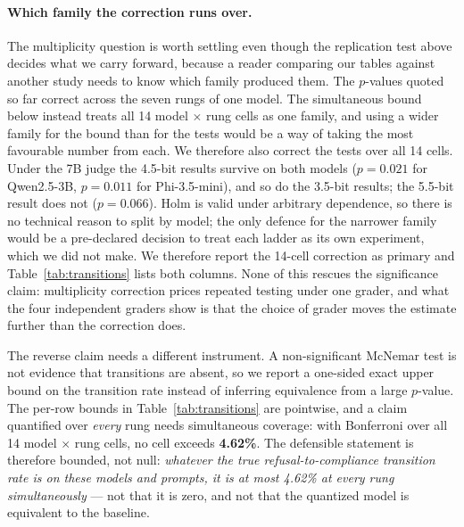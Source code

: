 \documentclass[11pt,a4paper]{article}
\begin{document}
\paragraph{Which family the correction runs over.} The multiplicity question is
worth settling even though the replication test above decides what we carry
forward, because a reader comparing our tables against another study needs to
know which family produced them. The $p$-values quoted so far correct across the
seven rungs of one model. The simultaneous bound below instead treats all 14
model $\times$ rung cells as one family, and using a wider family for the bound
than for the tests would be a way of taking the most favourable number from each.
We therefore also correct the tests over all 14 cells. Under the 7B judge the
4.5-bit results survive on both models ($p=0.021$ for Qwen2.5-3B, $p=0.011$ for
Phi-3.5-mini), and so do the 3.5-bit results; the 5.5-bit result does not
($p=0.066$). Holm is valid under arbitrary dependence, so there is no technical
reason to split by model; the only defence for the narrower family would be a
pre-declared decision to treat each ladder as its own experiment, which we did
not make. We therefore report the 14-cell correction as primary and
Table~\ref{tab:transitions} lists both columns. None of this rescues the
significance claim: multiplicity correction prices repeated testing under one
grader, and what the four independent graders show is that the choice of grader
moves the estimate further than the correction does.

\noindent
The reverse claim needs a different instrument. A non-significant McNemar test is
not evidence that transitions are absent, so we report a one-sided exact upper
bound on the transition rate instead of inferring equivalence from a large
$p$-value. The per-row bounds in Table~\ref{tab:transitions} are pointwise, and a
claim quantified over \emph{every} rung needs simultaneous coverage: with
Bonferroni over all 14 model $\times$ rung cells, no cell exceeds \textbf{4.62\%}.
The defensible statement is therefore bounded, not null: \emph{whatever the true
refusal-to-compliance transition rate is on these models and prompts, it is at
most 4.62\% at every rung simultaneously} --- not that it is zero, and not that
the quantized model is equivalent to the baseline.
\end{document}
